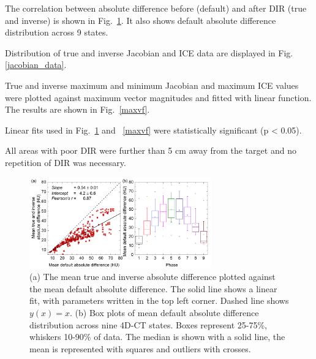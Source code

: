 The correlation between absolute difference before (default) and after DIR (true and inverse) is shown in Fig.~\ref{absDiff_lung}. It also shows default absolute difference distribution across 9 states. 

Distribution of true and inverse Jacobian and ICE data are displayed in Fig. \ref{jacobian_data}. 

True and inverse maximum and minimum Jacobian and maximum ICE values were plotted against maximum vector magnitudes and fitted with linear function. The results are shown in Fig.~\ref{maxvf}.


Linear fits used in Fig.~\ref{absDiff_lung} and ~\ref{maxvf} were statistically significant (p < 0.05).

All areas with poor DIR were further than 5 cm away from the target and no repetition of DIR was necessary.

\begin{figure}[H]
	\begin{center}		
		\includegraphics[width=0.7\textwidth]{./Vmm/Images/absDiff.png}
		\caption{(a) The mean true and inverse absolute difference plotted against the mean default absolute difference. The solid line shows a linear fit, with parameters
		written in the top left corner. Dashed line shows $y(x)=x$. (b) Box plots of mean default absolute difference distribution across nine 4D-CT states. Boxes represent 25-75\%, whiskers 10-90\%
		of data. The median is shown with a solid line, the mean is represented with squares and outliers with crosses.}
		\label{absDiff_lung}
	\end{center}
\end{figure}

